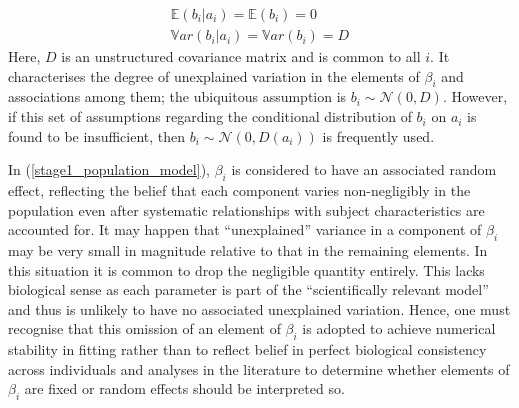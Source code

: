 \documentclass[11pt]{article} %
\begin{document}
\begin{equation}
\begin{array}{l}
\mathbb{E}(b_i|a_i) = \mathbb{E}(b_i) = 0 \\
\mathbb{V}ar(b_i|a_i) = \mathbb{V}ar(b_i) = D
\end{array}
\end{equation}
Here, $D$ is an unstructured covariance matrix and is common to all $i$. It characterises the degree of unexplained variation in the elements of $\beta_i$ and associations among them; the ubiquitous assumption is $b_i \sim \mathcal{N}(0,D)$. However, if this set of assumptions regarding the conditional distribution of $b_i$ on $a_i$ is found to be insufficient, then $b_i \sim \mathcal{N}\left(0,D(a_i)\right)$ is frequently used.

In (\ref{stage1_population_model}), $\beta_i$ is considered to have an associated random effect, reflecting the belief that each component varies non-negligibly in the population even after systematic relationships with subject characteristics are accounted for. It may happen that ``unexplained'' variance in a component of $\beta_i$ may be very small in magnitude relative to that in the remaining elements. In this situation it is common to drop the negligible quantity entirely. This lacks biological sense as each parameter is part of the ``scientifically relevant model'' and thus is unlikely to have no associated unexplained variation. Hence, one must recognise that this omission of an element of $\beta_i$ is adopted to achieve numerical stability in fitting rather than to reflect belief in perfect biological consistency across individuals and analyses in the literature to determine whether elements of $\beta_i$ are fixed or random effects should be interpreted so.

%

%

\end{document}
